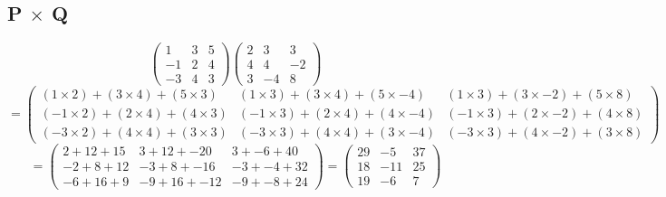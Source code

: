 \documentclass[a4paper,12pt]{article}
\begin{document}
    \subsection{P $\times$ Q}
      \begin{equation}
        \begin{pmatrix}
          1 & 3 & 5\\
          -1 & 2 & 4\\
          -3 & 4 & 3
        \end{pmatrix}
        \begin{pmatrix}
          2 & 3 & 3\\
          4 & 4 & -2\\
          3 & -4 & 8
        \end{pmatrix}
      \end{equation}
      \begin{equation}
        =
        \begin{pmatrix}
          ( 1 \times 2) + (3 \times 4) + (5 \times 3) & ( 1 \times 3) + (3 \times 4) + (5 \times -4) & ( 1 \times 3) + (3 \times -2) + (5 \times 8)\\
          (-1 \times 2) + (2 \times 4) + (4 \times 3) & (-1 \times 3) + (2 \times 4) + (4 \times -4) & (-1 \times 3) + (2 \times -2) + (4 \times 8)\\
          (-3 \times 2) + (4 \times 4) + (3 \times 3) & (-3 \times 3) + (4 \times 4) + (3 \times -4) & (-3 \times 3) + (4 \times -2) + (3 \times 8)
        \end{pmatrix}
      \end{equation}
      \begin{equation}
        =
        \begin{pmatrix}
          2 + 12 + 15 & 3 + 12 + -20 & 3 + -6 + 40\\
          -2 + 8 + 12 & -3 + 8 + -16 & -3 + -4 + 32\\
          -6 + 16 + 9 & -9 + 16 + -12 & -9 + -8 + 24
        \end{pmatrix}
        =
        \begin{pmatrix}
          29 & -5 & 37\\
          18 & -11 & 25\\
          19 & -6 & 7
        \end{pmatrix}
      \end{equation}

      \newpage
\end{document}
